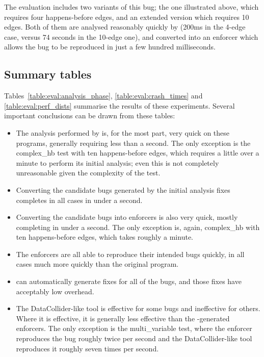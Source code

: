 The evaluation includes two variants of this bug; the one illustrated
above, which requires four happens-before edges, and an extended
version which requires 10 edges.  Both of them are analysed reasonably
quickly by {\implementation} (200ms in the 4-edge case, versus 74
seconds in the 10-edge one), and converted into an enforcer which
allows the bug to be reproduced in just a few hundred milliseconds.

\subsection{Summary tables}


Tables~\ref{table:eval:analysis_phase}, \ref{table:eval:crash_times}
and \ref{table:eval:perf_dists} summarise the results of these
experiments.  Several important conclusions can be drawn from these
tables:

\begin{itemize}
\item
  The analysis performed by {\technique} is, for the most part, very
  quick on these programs, generally requiring less than a second.
  The only exception is the complex\_hb test with ten happens-before
  edges, which requires a little over a minute to perform its initial
  analysis; even this is not completely unreasonable given the
  complexity of the test.
\item
  Converting the candidate bugs generated by the initial analysis
  fixes completes in all cases in under a second.
\item
  Converting the candidate bugs into enforcers is also very quick,
  mostly completing in under a second.  The only exception is,
  again, complex\_hb with ten happens-before edges, which takes
  roughly a minute.
\item
  The enforcers are all able to reproduce their intended bugs
  quickly, in all cases much more quickly than the original program.
\item
  {\Technique} can automatically generate fixes for all of the bugs,
  and those fixes have acceptably low overhead.
\item
  The DataCollider-like tool is effective for some bugs and
  ineffective for others.  Where it is effective, it is generally less
  effective than the {\technique}-generated enforcers.  The only
  exception is the multi\_variable test, where the {\technique}
  enforcer reproduces the bug roughly twice per second and the
  DataCollider-like tool reproduces it roughly seven times per
  second.  
\end{itemize}
        

